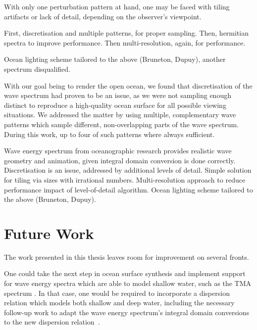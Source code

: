 With only one perturbation pattern at hand, one may be faced with tiling
artifacts or lack of detail, depending on the observer's viewpoint.


First, discretisation and multiple patterns, for proper sampling. Then,
hermitian spectra to improve performance. Then multi-resolution, again,
for performance.

Ocean lighting scheme tailored to the above (Bruneton, Dupuy), another spectrum
disqualified.

With our goal being to render the open ocean, we found that discretisation
of the wave spectrum had proven to be an issue, as we were not sampling enough
distinct \wavenumbers to reproduce a high-quality ocean surface for all
possible viewing situations. We addressed the matter by using multiple,
complementary wave patterns which sample different, non-overlapping parts
of the wave spectrum. During this work, up to four of such patterns where
always sufficient.


Wave energy spectrum from oceanographic research provides realistic wave geometry
and animation, given integral domain conversion is done correctly.
Discretisation is an issue, addressed by additional levels of detail.
Simple solution for tiling via sizes with irrational numbers.
Multi-resolution approach to reduce performance impact of level-of-detail
algorithm.
Ocean lighting scheme tailored to the above (Bruneton, Dupuy).

\section{Future Work}
The work presented in this thesis leaves room for improvement on several fronts.

One could take the next step in ocean surface synthesis and implement support
for wave energy spectra which are able to model shallow water, such as the
TMA spectrum \citep{Hughes:1984}. In that case, one would be required to
incorporate a dispersion relation which models both shallow and deep water,
including the necessary follow-up work to adapt the wave energy spectrum's
integral domain conversions to the new dispersion relation~\citep{Horvath:2015}.

